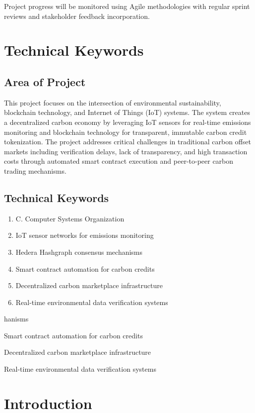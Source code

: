 \documentclass[oneside,a4paper,12pt]{book}
\begin{document}
Project progress will be monitored using Agile methodologies with regular sprint reviews and stakeholder feedback incorporation.

\chapter{Technical Keywords}
\section{Area of Project}
This project focuses on the intersection of environmental sustainability, blockchain technology, and Internet of Things (IoT) systems. The system creates a decentralized carbon economy by leveraging IoT sensors for real-time emissions monitoring and blockchain technology for transparent, immutable carbon credit tokenization. The project addresses critical challenges in traditional carbon offset markets including verification delays, lack of transparency, and high transaction costs through automated smart contract execution and peer-to-peer carbon trading mechanisms.

\section{Technical Keywords}
\begin{enumerate}
    \item C. Computer Systems Organization 
\item IoT sensor networks for emissions monitoring  
\item Hedera Hashgraph consensus mechanisms
\item Smart contract automation for carbon credits
\item Decentralized carbon marketplace infrastructure
\item Real-time environmental data verification systems
\end{enumerate}
hanisms
\item Smart contract automation for carbon credits
\item Decentralized carbon marketplace infrastructure
\item Real-time environmental data verification systems

\chapter{Introduction}
\end{document}
